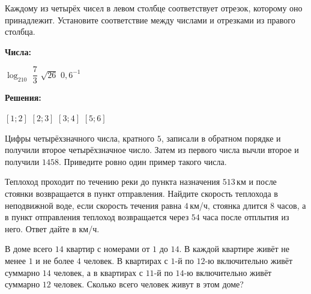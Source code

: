 \begin{training}[1]
\begin{listofex}
	\item Каждому из четырёх чисел в левом столбце соответствует отрезок, которому оно принадлежит. Установите соответствие между числами и отрезками из правого столбца. \\
	\begin{minipage}[t]{0.55\linewidth}
		\textbf{Числа:}
		\begin{tasks}
			\task \( \log_210 \)
			\task \( \dfrac{7}{3} \)
			\task \( \sqrt{26} \)
			\task \( 0,6^{-1} \)
		\end{tasks}
	\end{minipage}
	\hspace{0.02\linewidth}
	\begin{minipage}[t]{0.4\linewidth}
		\textbf{Решения:}
		\begin{tasks}
			\task \( [1;2] \)
			\task \( [2;3] \)
			\task \( [3;4] \)
			\task \( [5;6] \)
		\end{tasks}
	\end{minipage}
	\item Цифры четырёхзначного числа, кратного \(5\), записали в обратном порядке и получили второе четырёхзначное число. Затем из первого числа вычли второе и получили \(1458\). Приведите ровно один пример такого числа.
	\item Теплоход проходит по течению реки до пункта назначения \( 513 \) км и после стоянки возвращается в пункт отправления. Найдите скорость теплохода в неподвижной воде, если скорость течения равна \( 4 \) км/ч, стоянка длится \( 8 \) часов, а в пункт отправления теплоход возвращается через \( 54 \) часа после отплытия из него. Ответ дайте в км/ч.
	\item В доме всего \(14\) квартир с номерами от \(1\) до \(14\). В каждой квартире живёт не менее \(1\) и не более \(4\) человек. В квартирах с \(1\)-й по \(12\)-ю включительно живёт суммарно \(14\) человек, а в квартирах с \(11\)-й по \(14\)-ю включительно живёт суммарно \(12\) человек. Сколько всего человек живут в этом доме?
	\end{listofex}
\end{training}
